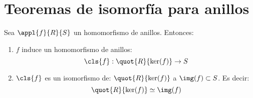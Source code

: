 \section{Teoremas de isomorfía para anillos}

\begin{theorem} \label{thm:IsomorfiaAnillos1}
Sea $\appl{f}{R}{S}$ un homomorfismo de anillos. Entonces:
\begin{enumerate}
	\item $f$ induce un homomorfismo de anillos:$$ \cls{f}: \quot{R}{\ker (f)} \rightarrow S$$
	\item $\cls{f}$ es un isomorfismo de:
	$\quot{R}{\ker (f)}$ a $\img (f) \subset S$. Es decir:
	$$\quot{R}{\ker (f)} \simeq \img (f)$$
\end{enumerate}
\end{theorem}

